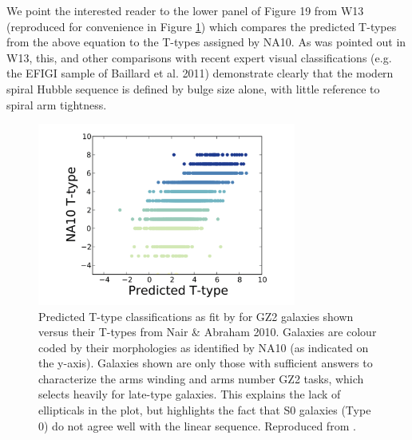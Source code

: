 \documentclass[usenatbib]{mn2e}
\begin{document}
We point the interested reader to the lower panel of Figure 19 from W13 (reproduced for convenience in Figure \ref{T-type}) which compares the predicted T-types from the above equation to the T-types assigned by NA10. As was pointed out in W13, this, and other comparisons with recent expert visual classifications (e.g. the EFIGI sample of Baillard et al. 2011) demonstrate clearly that the modern spiral Hubble sequence is defined by bulge size alone, with little reference to spiral arm tightness. 

\begin{figure}
\includegraphics[height=60mm,angle=0]{T-typeW13.png}
\caption{Predicted T-type classifications as fit by \citet{Willett2013} for GZ2 galaxies shown versus their T-types from Nair \& Abraham 2010. Galaxies are colour coded by their morphologies as identified by NA10 (as indicated on the y-axis). Galaxies shown are only those with sufficient answers to characterize the arms winding and arms number GZ2 tasks, which selects heavily for late-type galaxies. This explains the lack of ellipticals in the plot, but highlights the fact that S0 galaxies (Type 0) do not agree well with the linear sequence. Reproduced from \citet{Willett2013}.  \label{T-type}}
\end{figure}

\end{document}
